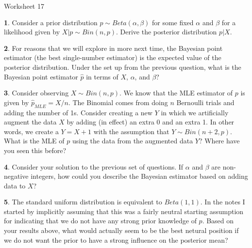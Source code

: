 \documentclass{tufte-handout}
\begin{document}
\justify

{\LARGE Worksheet 17}

\vspace*{18pt}


\textbf{1}. Consider a prior distribution $p \sim Beta(\alpha, \beta)$ for some fixed
$\alpha$ and $\beta$ for a likelihood given by $X|p \sim Bin(n, p)$. Derive
the posterior distribution $p|X$.

\textbf{2}. For reasons that we will explore in more next time, the Bayesian point estimator
(the best single-number estimator) is the expected value of the posterior
distribution. Under the set up from the previous question, what is the Bayesian
point estimator $\widehat{p}$ in terms of $X$, $\alpha$, and $\beta$?

\textbf{3}. Consider observing $X \sim Bin(n, p)$. We know that the MLE estimator of $p$ is
given by $\hat{p}_{MLE} = X / n$. The Binomial comes from doing $n$ Bernoulli
trials and adding the number of 1s. Consider creating a new $Y$ in which we 
artificially augment the data $X$ by adding (in effect) an extra 0 and an extra
1. In other words, we create a $Y = X + 1$ with the assumption that
$Y \sim Bin(n+2, p)$. What is the MLE of $p$ using the data from the augmented
data $Y$? Where have you seen this before?

\textbf{4}. Consider your solution to the previous set of questions. If $\alpha$ and $\beta$
are non-negative integers, how could you describe the Bayesian estimator based
on adding data to $X$? 

\textbf{5}. The standard uniform distribution is equivalent to $Beta(1, 1)$. In the notes
I started by implicitly assuming that this was a fairly neutral starting
assumption for indicating that we do not have any strong prior knowledge of
$p$. Based on your results above, what would actually seem to be the best
netural position if we do not want the prior to have a strong influence on 
the posterior mean?
\end{document}
